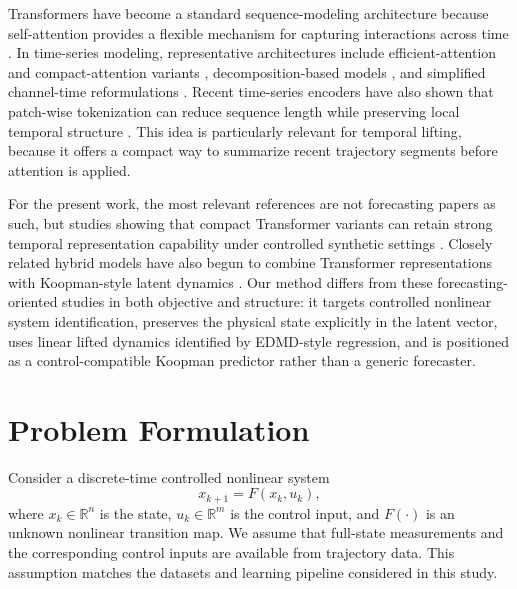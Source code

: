 \documentclass[journal]{IEEEtran}
\begin{document}
Transformers have become a standard sequence-modeling architecture because self-attention provides a flexible mechanism for capturing interactions across time \cite{vaswani2017attention}. In time-series modeling, representative architectures include efficient-attention and compact-attention variants \cite{zhou2021informer, wang2020linformer, katharopoulos2020transformers, choromanski2021performer}, decomposition-based models \cite{wu2021autoformer, zhou2022fedformer}, and simplified channel-time reformulations \cite{zeng2023transformers, liu2024itransformer}. Recent time-series encoders have also shown that patch-wise tokenization can reduce sequence length while preserving local temporal structure \cite{nie2023time}. This idea is particularly relevant for temporal lifting, because it offers a compact way to summarize recent trajectory segments before attention is applied.

For the present work, the most relevant references are not forecasting papers as such, but studies showing that compact Transformer variants can retain strong temporal representation capability under controlled synthetic settings \cite{forootani2026compact, forootani2025synthetic}. Closely related hybrid models have also begun to combine Transformer representations with Koopman-style latent dynamics \cite{forootani2026deepkoopformer, forootani2026spectral}. Our method differs from these forecasting-oriented studies in both objective and structure: it targets controlled nonlinear system identification, preserves the physical state explicitly in the latent vector, uses linear lifted dynamics identified by EDMD-style regression, and is positioned as a control-compatible Koopman predictor rather than a generic forecaster.

\section{Problem Formulation}
\label{sec:problem}

Consider a discrete-time controlled nonlinear system
\begin{equation}
    x_{k+1} = F(x_k,u_k),
    \label{eq:nonlinear_system}
\end{equation}
where $x_k \in \mathbb{R}^n$ is the state, $u_k \in \mathbb{R}^m$ is the control input, and $F(\cdot)$ is an unknown nonlinear transition map. We assume that full-state measurements and the corresponding control inputs are available from trajectory data. This assumption matches the datasets and learning pipeline considered in this study.
\end{document}
